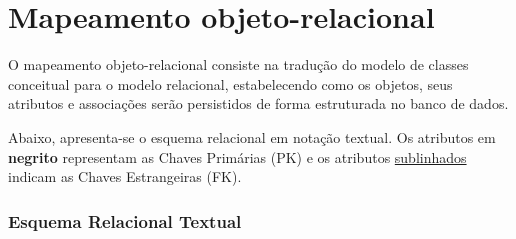 \chapter{Mapeamento objeto-relacional}
O mapeamento objeto-relacional consiste na tradução do modelo de classes conceitual para o modelo relacional, estabelecendo como os objetos, seus atributos e associações serão persistidos de forma estruturada no banco de dados.

Abaixo, apresenta-se o esquema relacional em notação textual. Os atributos em \textbf{negrito} representam as Chaves Primárias (PK) e os atributos \underline{sublinhados} indicam as Chaves Estrangeiras (FK).

\subsection{Esquema Relacional Textual}

